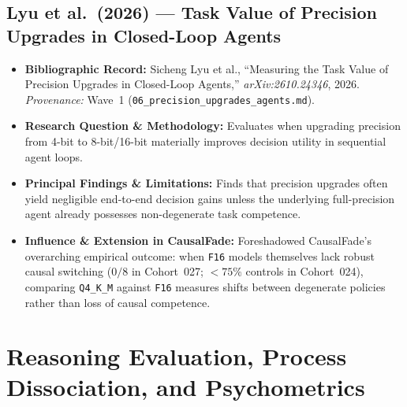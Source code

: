 \subsection{Lyu et al.\ (2026) --- Task Value of Precision Upgrades in Closed-Loop Agents \citep{lyu2026precision}}
\begin{itemize}
  \item \textbf{Bibliographic Record:} Sicheng Lyu et al., ``Measuring the Task Value of Precision Upgrades in Closed-Loop Agents,'' \emph{arXiv:2610.24346}, 2026. \emph{Provenance:} Wave~1 (\texttt{06\_precision\_upgrades\_agents.md}).
  \item \textbf{Research Question \& Methodology:} Evaluates when upgrading precision from 4-bit to 8-bit/16-bit materially improves decision utility in sequential agent loops.
  \item \textbf{Principal Findings \& Limitations:} Finds that precision upgrades often yield negligible end-to-end decision gains unless the underlying full-precision agent already possesses non-degenerate task competence.
  \item \textbf{Influence \& Extension in CausalFade:} Foreshadowed CausalFade's overarching empirical outcome: when \texttt{F16} models themselves lack robust causal switching ($0/8$ in Cohort~027; $<75\%$ controls in Cohort~024), comparing \texttt{Q4\_K\_M} against \texttt{F16} measures shifts between degenerate policies rather than loss of causal competence.
\end{itemize}

\section{Reasoning Evaluation, Process Dissociation, and Psychometrics}

